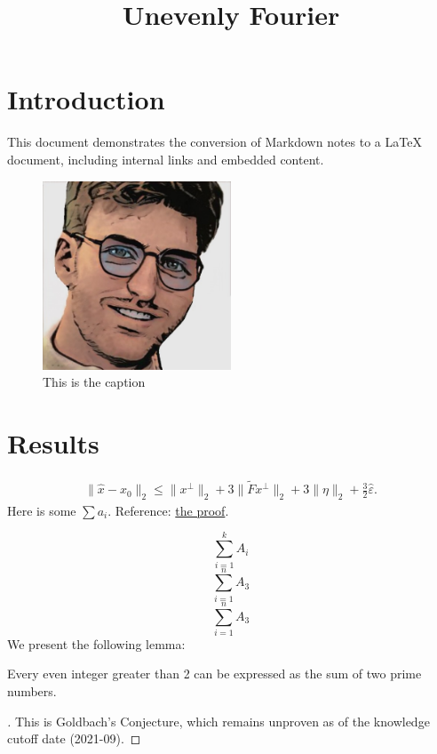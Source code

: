 \documentclass{article}
\title{Unevenly Fourier}
\begin{document}
\maketitle
{}
\section{Introduction}
\label{introduction}
This document demonstrates the conversion of Markdown notes to a LaTeX document, including internal links and embedded content.

\begin{figure}[h]
\label{download.jpeg}
\centering
\includegraphics[width=0.5\textwidth]{Files/download.jpeg}
\caption{This is the caption}
\end{figure}
\section{Results}
\label{results}


\begin{align*}
\|\hat x - x_0\|_2
\leq \|x^\perp\|_2 + 3\|\tilde{F}x^\perp\|_2 + 3 \|\eta\|_2 + \frac{3}{2}\hat\varepsilon.
\end{align*}
Here is some $\sum a_i$. Reference: \hyperlink{proof:lemma_1}{the proof}.

$$\sum_{i=1}^k A_i$$
$$\sum_{i=1}^n A_3$$
$$\sum_{i=1}^n A_3$$
We present the following lemma:

\begin{lemma}[lemma_1]
\label{lemma_1}
Every even integer greater than 2 can be expressed as the sum of two prime numbers.

\end{lemma}

\begin{proof}[\hypertarget{proof:lemma_1}Proof of \autoref{lemma_1}]
\label{proof:lemma_1}
This is Goldbach's Conjecture, which remains unproven as of the knowledge cutoff date (2021-09).

\end{proof}
\end{document}
